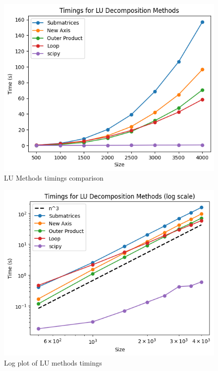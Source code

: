 \begin{figure}[H]
  \centering
    \includegraphics[scale=0.75]{Include/Images/Thesis/Analysis of Solutions/Linear Systems/LU Timings.png}
    \caption{LU Methods timings comparison}
    \label{fig:LU Methods comparison}
\end{figure}
\begin{figure}[H]
    \centering
    \includegraphics[scale=0.75]{Include/Images/Thesis/Analysis of Solutions/Linear Systems/LU Timings LOG.png}
    \caption{Log plot of LU methods timings}
    \label{fig:Log plot of LU methods}
\end{figure}

